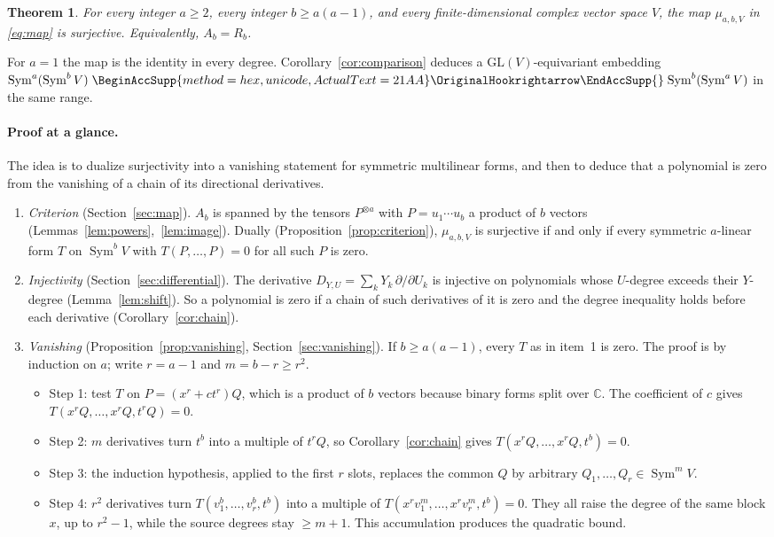 \documentclass[11pt]{article}
\renewcommand{\hookrightarrow}{\mathrel{
  \BeginAccSupp{method=hex,unicode,ActualText=21AA}
  \OriginalHookrightarrow\EndAccSupp{}}}
\newtheorem{theorem}{Theorem}
\theoremstyle{remark}
\DeclareMathOperator{\Sym}{Sym}
\newcommand{\C}{\mathbb C}
\newcommand{\D}[2]{D_{#1,#2}}
\begin{document}
\begin{theorem}\label{thm:main}
For every integer $a\ge2$, every integer $b\ge a(a-1)$, and every
finite-dimensional complex vector space $V$, the map
$\mu_{a,b,V}$ in \eqref{eq:map} is surjective. Equivalently, $A_b=R_b$.
\end{theorem}

For $a=1$ the map is the identity in every degree. Corollary~\ref{cor:comparison} deduces
a $\mathrm{GL}(V)$-equivariant embedding
$\Sym^a(\Sym^bV)\hookrightarrow\Sym^b(\Sym^aV)$ in the same range.

\paragraph{Proof at a glance.}
The idea is to dualize surjectivity into a vanishing statement for symmetric
multilinear forms, and then to deduce that a polynomial is zero from the
vanishing of a chain of its directional derivatives.
\begin{enumerate}[nosep]
\item \emph{Criterion} (Section~\ref{sec:map}). $A_b$ is spanned by the
tensors $P^{\otimes a}$ with $P=u_1\cdots u_b$ a product of $b$ vectors
(Lemmas~\ref{lem:powers},~\ref{lem:image}). Dually
(Proposition~\ref{prop:criterion}), $\mu_{a,b,V}$ is surjective if and only if
every symmetric $a$-linear form $T$ on $\Sym^bV$ with $T(P,\ldots,P)=0$ for
all such $P$ is zero.
\item \emph{Injectivity} (Section~\ref{sec:differential}). The derivative
$\D{Y}{U}=\sum_kY_k\,\partial/\partial U_k$ is injective on polynomials whose
$U$-degree exceeds their $Y$-degree (Lemma~\ref{lem:shift}). So a polynomial
is zero if a chain of such derivatives of it is zero and the degree inequality
holds before each derivative (Corollary~\ref{cor:chain}).
\item \emph{Vanishing} (Proposition~\ref{prop:vanishing},
Section~\ref{sec:vanishing}). If $b\ge a(a-1)$, every $T$ as in item~1 is
zero. The proof is by induction on $a$; write $r=a-1$ and $m=b-r\ge r^2$.
 \begin{itemize}[nosep]
 \item Step 1: test $T$ on $P=(x^r+ct^r)Q$, which is a product of $b$ vectors
 because binary forms split over $\C$. The coefficient of $c$ gives
 $T(x^rQ,\ldots,x^rQ,t^rQ)=0$.
 \item Step 2: $m$ derivatives turn $t^b$ into a multiple of $t^rQ$, so
 Corollary~\ref{cor:chain} gives $T(x^rQ,\ldots,x^rQ,t^b)=0$.
 \item Step 3: the induction hypothesis, applied to the first $r$ slots,
 replaces the common $Q$ by arbitrary $Q_1,\ldots,Q_r\in\Sym^mV$.
 \item Step 4: $r^2$ derivatives turn $T(v_1^b,\ldots,v_r^b,t^b)$ into a
 multiple of $T(x^rv_1^m,\ldots,x^rv_r^m,t^b)=0$. They all raise the degree
 of the same block $x$, up to $r^2-1$, while the source degrees stay
 $\ge m+1$. This accumulation produces the quadratic bound.
 \end{itemize}
\end{enumerate}
\end{document}
